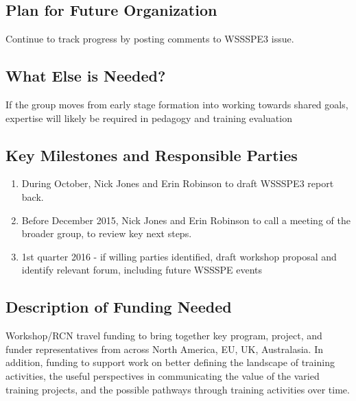 \subsection{Plan for Future Organization}

Continue to track progress by posting comments to WSSSPE3 issue.

\subsection{What Else is Needed?}

If the group moves from early stage formation into working towards shared goals, expertise will likely be required in pedagogy and training evaluation

\subsection{Key Milestones and Responsible Parties}
\begin{enumerate}
    \item During October, Nick Jones and Erin Robinson to draft WSSSPE3 report back. 
    \item Before December 2015, Nick Jones and Erin Robinson to call a meeting of the broader group, to review key next steps. 
    \item 1st quarter 2016 - if willing parties identified, draft workshop proposal and identify relevant forum, including future WSSSPE events
\end{enumerate}

\subsection{Description of Funding Needed}

Workshop/RCN travel funding to bring together key program, project, and funder representatives from across North America, EU, UK, Australasia. In addition, funding to support work on better defining the landscape of training activities, the useful perspectives in communicating the value of the varied training projects, and the possible pathways through training activities over time.
